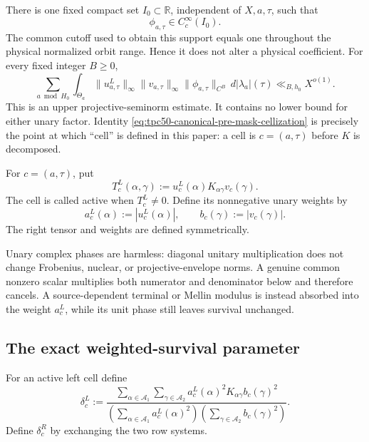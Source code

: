 There is one fixed compact set \(I_0\subset\mathbb R\), independent of
\(X,a,\tau\), such that
\begin{equation}
 \phi_{a,\tau}\in C_c^\infty(I_0).
 \label{eq:tpc50-common-profile-support}
\end{equation}
The common cutoff used to obtain this support equals one throughout the
physical normalized orbit range.  Hence it does not alter a physical
coefficient.  For every fixed integer \(B\ge0\),
\begin{equation}
 \sum_{a\bmod H_0}\int_{\Theta_a}
 \|u_{a,\tau}^{L}\|_\infty
 \|v_{a,\tau}\|_\infty
 \|\phi_{a,\tau}\|_{C^B}
 \,d|\lambda_a|(\tau)
 \ll_{B,h_0}X^{o(1)}.
 \label{eq:tpc50-canonical-seminorm-mass}
\end{equation}
This is an upper projective-seminorm estimate.  It contains no lower
bound for either unary factor.  Identity
\eqref{eq:tpc50-canonical-pre-mask-cellization} is precisely the point
at which ``cell'' is defined in this paper: a cell is
\(c=(a,\tau)\) before \(K\) is decomposed.

\begin{definition}
\label{def:tpc50-literal-cell}
For \(c=(a,\tau)\), put
\begin{equation}
 T_c^L(\alpha,\gamma)
 :=u_c^L(\alpha)K_{\alpha\gamma}v_c(\gamma).
 \label{eq:tpc50-literal-cell-tensor}
\end{equation}
The cell is called active when \(T_c^L\ne0\).  Define its nonnegative
unary weights by
\begin{equation}
 a_c^L(\alpha):=|u_c^L(\alpha)|,
 \qquad b_c(\gamma):=|v_c(\gamma)|.
 \label{eq:tpc50-cell-unary-weights}
\end{equation}
The right tensor and weights are defined symmetrically.
\end{definition}

Unary complex phases are harmless: diagonal unitary multiplication
does not change Frobenius, nuclear, or projective-envelope norms.  A
genuine common nonzero scalar multiplies both numerator and denominator
below and therefore cancels.  A source-dependent terminal or Mellin
modulus is instead absorbed into the weight \(a_c^L\), while its unit
phase still leaves survival unchanged.

\subsection{The exact weighted-survival parameter}

\begin{definition}
\label{def:tpc50-cell-survival}
For an active left cell define
\begin{equation}
 \boxed{
 \delta_c^L
 :=\frac{\displaystyle
  \sum_{\alpha\in\mathcal A_1}
  \sum_{\gamma\in\mathcal A_2}
  a_c^L(\alpha)^2K_{\alpha\gamma}b_c(\gamma)^2}
 {\displaystyle
  \left(\sum_{\alpha\in\mathcal A_1}a_c^L(\alpha)^2\right)
  \left(\sum_{\gamma\in\mathcal A_2}b_c(\gamma)^2\right)}.}
 \label{eq:tpc50-exact-cell-survival}
\end{equation}
Define \(\delta_c^R\) by exchanging the two row systems.
\end{definition}

